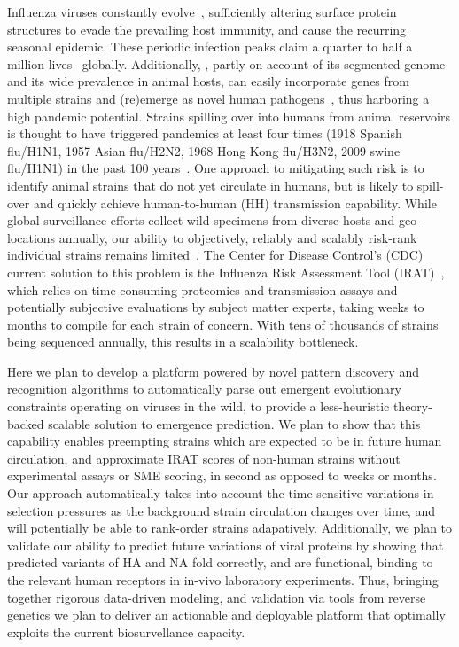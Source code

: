 \documentclass[onecolumn, compsoc,10pt]{IEEEtran}
\begin{document}
  
Influenza viruses constantly evolve~\cite{dos2016influenza}, sufficiently altering surface protein structures to evade the prevailing host immunity, and cause the recurring seasonal  epidemic. These periodic  infection peaks claim a quarter to half a million lives~\cite{huddleston2020integrating} globally. Additionally, \infl, partly on account of its segmented genome and its wide prevalence in animal hosts, can easily incorporate genes from multiple strains and (re)emerge as novel human pathogens~\cite{reid2003origin}, thus harboring  a high pandemic potential. Strains spilling over into humans from animal reservoirs is thought to have triggered  pandemics  at least four times (1918 Spanish flu/H1N1, 1957 Asian flu/H2N2, 1968 Hong Kong flu/H3N2, 2009 swine flu/H1N1) in the past 100 years~\cite{shao2017evolution}. One  approach to mitigating such risk is to identify  animal strains  that do not yet circulate in humans, but is likely to spill-over and quickly achieve human-to-human (HH) transmission capability. While global surveillance efforts collect wild specimens from diverse hosts and geo-locations annually, our  ability to objectively, reliably and scalably  risk-rank individual strains remains limited~\cite{wille2021accurately}. The Center for Disease Control's (CDC) current solution to this problem is the Influenza Risk Assessment Tool (IRAT)~\cite{Influenz24:online}, which relies on time-consuming proteomics and transmission assays and potentially subjective evaluations by subject matter experts, taking  weeks to months to compile for each strain of concern. With tens of   thousands of strains being sequenced annually, this results in  a scalability bottleneck. 

Here we plan to develop a platform powered by novel pattern discovery and recognition algorithms to automatically parse out emergent evolutionary constraints operating on \infl viruses in the wild, to provide a less-heuristic theory-backed scalable solution to emergence prediction. %
We plan to show   that this capability enables preempting  strains which are expected to be in future human circulation, and  approximate IRAT scores of non-human strains without  experimental assays or SME scoring, in second as opposed to weeks or months. Our approach automatically takes into account the time-sensitive variations in selection pressures as the background strain circulation changes over time, and will potentially be able to rank-order strains adapatively. Additionally, we plan to validate our ability to predict future variations of viral proteins by showing that predicted variants of HA and NA fold correctly, and are functional, binding to the relevant human receptors in in-vivo laboratory experiments. Thus, bringing together rigorous data-driven modeling, and validation via tools from reverse genetics we plan to deliver an actionable and deployable platform that optimally exploits the current biosurvellance capacity.
\end{document}
